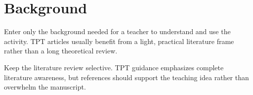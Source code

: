 \section{Background}

Enter only the background needed for a teacher to understand and use the activity. TPT articles usually benefit from a light, practical literature frame rather than a long theoretical review.

Keep the literature review selective. TPT guidance emphasizes complete literature awareness, but references should support the teaching idea rather than overwhelm the manuscript.
